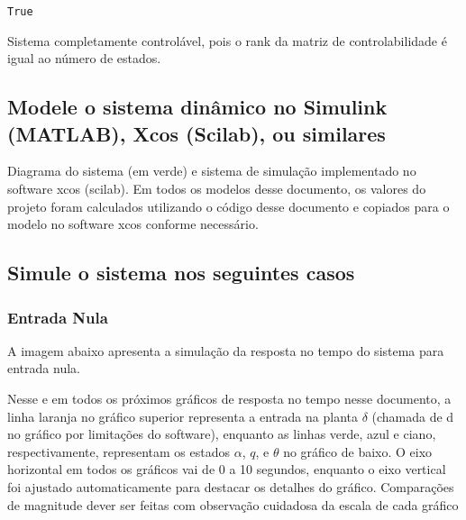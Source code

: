 \documentclass[13pt]{article}
\begin{document}
    \begin{Verbatim}[commandchars=\\\{\}]
True
    \end{Verbatim}

    Sistema completamente controlável, pois o rank da matriz de
controlabilidade é igual ao número de estados.

    \hypertarget{modele-o-sistema-dinuxe2mico-no-simulink-matlab-xcos-scilab-ou-similares}{%
\subsection{Modele o sistema dinâmico no Simulink (MATLAB), Xcos
(Scilab), ou
similares}\label{modele-o-sistema-dinuxe2mico-no-simulink-matlab-xcos-scilab-ou-similares}}

    Diagrama do sistema (em verde) e sistema de simulação implementado no
software xcos (scilab). Em todos os modelos desse documento, os valores
do projeto foram calculados utilizando o código desse documento e
copiados para o modelo no software xcos conforme necessário.

    \begin{figure}[H]
    \centering    
        
    \end{figure}

    \hypertarget{simule-o-sistema-nos-seguintes-casos}{%
\subsection{Simule o sistema nos seguintes
casos}\label{simule-o-sistema-nos-seguintes-casos}}

    \hypertarget{entrada-nula}{%
\subsubsection{Entrada Nula}\label{entrada-nula}}

    A imagem abaixo apresenta a simulação da resposta no tempo do sistema
para entrada nula.

Nesse e em todos os próximos gráficos de resposta no tempo nesse
documento, a linha laranja no gráfico superior representa a entrada na
planta \(\delta\) (chamada de d no gráfico por limitações do software),
enquanto as linhas verde, azul e ciano, respectivamente, representam os
estados \(\alpha\), \(q\), e \(\theta\) no gráfico de baixo. O eixo
horizontal em todos os gráficos vai de 0 a 10 segundos, enquanto o eixo
vertical foi ajustado automaticamente para destacar os detalhes do
gráfico. Comparações de magnitude dever ser feitas com observação
cuidadosa da escala de cada gráfico
\end{document}
